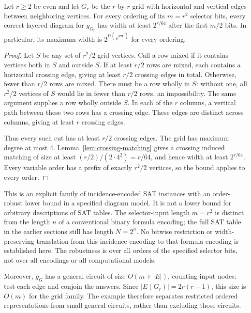 \begin{proposition}
\label{prop:grid-orders}
Let \(r\geq2\) be even and let \(G_r\) be the \(r\)-by-\(r\) grid
with horizontal and vertical edges between neighboring vertices.
For every ordering of its \(m=r^2\) selector bits, every correct layered
diagram for \(g_{G_r}\) has width at least \(2^{r/64}\) after the first
\(m/2\) bits. In particular, its maximum width is
\(2^{\Omega(\sqrt m)}\) for every ordering.
\end{proposition}
\begin{proof}
Let \(S\) be any set of \(r^2/2\) grid vertices. Call a row mixed if
it contains vertices both in \(S\) and outside \(S\).
If at least \(r/2\) rows are mixed, each contains a horizontal crossing
edge, giving at least \(r/2\) crossing edges in total.
Otherwise, fewer than \(r/2\) rows are mixed. There must be a row wholly
in \(S\): without one, all \(r^2/2\) vertices of \(S\) would lie in
fewer than \(r/2\) rows, an impossibility. The same argument supplies a
row wholly outside \(S\). In each of the \(r\) columns, a vertical
path between these two rows has a crossing edge. These edges are distinct
across columns, giving at least \(r\) crossing edges.

Thus every such cut has at least \(r/2\) crossing edges. The grid has
maximum degree at most 4. Lemma~\ref{lem:crossing-matching} gives a
crossing induced matching of size at least
\((r/2)/(2\cdot4^2)=r/64\), and hence width at least \(2^{r/64}\).
Every variable order has a prefix of exactly \(r^2/2\) vertices, so the
bound applies to every order.
\end{proof}

This is an explicit family of incidence-encoded SAT instances with an
order-robust lower bound in a specified diagram model. It is not a lower
bound for arbitrary descriptions of SAT tables. The selector-input length
\(m=r^2\) is distinct from the length \(n\) of a conventional binary
formula encoding; the full SAT table in the earlier sections still has
length \(N=2^n\). No bitwise restriction or width-preserving translation
from this incidence encoding to that formula encoding is established here.
The robustness is over all orders of the specified selector bits, not over
all encodings or all computational models.

Moreover, \(g_G\) has a general circuit of size \(O(m+|E|)\), counting
input nodes: test each edge and conjoin the answers. Since
\(|E(G_r)|=2r(r-1)\), this size is \(O(m)\) for the grid family.
The example therefore separates restricted ordered representations from
small general circuits, rather than excluding those circuits.

\begin{table}[htbp]
\centering

\caption{Finite graph-family calculations . An exact dynamic
program over subsets computes the minimum, over all variable orders, of
the maximum residual width; it does not enumerate all orders factorially.
These are finite consistency observations, not proofs of the asymptotic bound.}
\label{tab:graph-orders}
\end{table}
